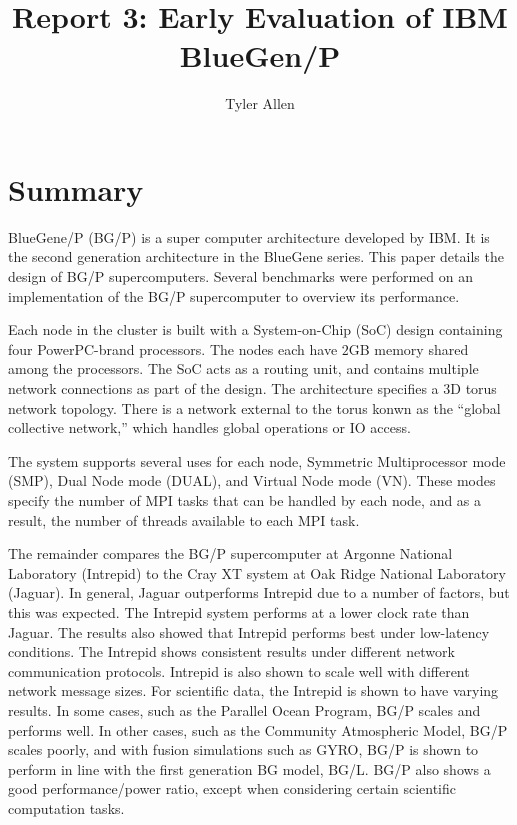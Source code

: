 \documentclass[11pt]{article}
\newcommand{\?}{\stackrel{?}{=}}
\begin{document}
\title{Report 3: Early Evaluation of IBM BlueGen/P}
\date{}
\author{Tyler Allen}
\maketitle

\doublespacing

\section{Summary}
BlueGene/P (BG/P) is a super computer architecture developed by IBM. It is the
second generation architecture in the BlueGene series. This paper details the 
design of BG/P supercomputers. Several benchmarks were performed on an implementation
of the BG/P supercomputer to overview its performance.

Each node in the cluster is built with a System-on-Chip (SoC) design containing
four PowerPC-brand processors. The nodes each have $2$GB memory shared among
the processors. The SoC acts as a routing unit, and contains multiple network
connections as part of the design. The architecture specifies a $3$D torus
network topology. There is a network external to the torus konwn as the 
``global collective network,'' which handles global operations or IO access.

The system supports several uses for each node, Symmetric Multiprocessor mode (SMP),
Dual Node mode (DUAL), and Virtual Node mode (VN). These modes specify the number
of MPI tasks that can be handled by each node, and as a result, the number of threads
available to each MPI task.

The remainder compares the BG/P supercomputer at Argonne National Laboratory 
(Intrepid) to the Cray XT system at Oak Ridge National Laboratory (Jaguar). 
In general, Jaguar outperforms Intrepid due to a number of factors, but this
was expected. The Intrepid system performs at a lower clock rate than Jaguar.
The results also showed that Intrepid performs best under low-latency conditions.
The Intrepid shows consistent results under different network communication
protocols. Intrepid is also shown to scale well with different network message
sizes. For scientific data, the Intrepid is shown to have varying results.
In some cases, such as the Parallel Ocean Program, BG/P scales and performs
well. In other cases, such as the Community Atmospheric Model, BG/P scales poorly,
and with fusion simulations such as GYRO, BG/P is shown to perform in line with
the first generation BG model, BG/L. BG/P also shows a good performance/power
ratio, except when considering certain scientific computation tasks.
\end{document}
